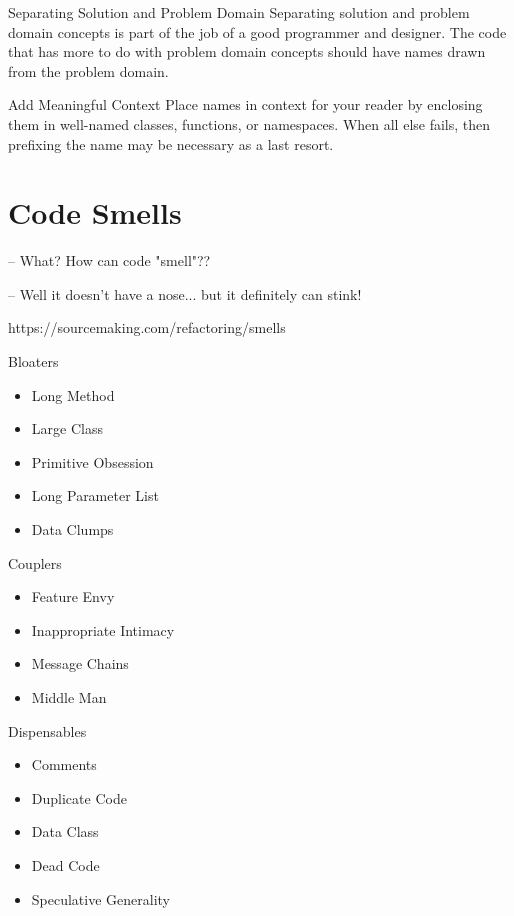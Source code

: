 \documentclass{beamer}
\begin{document}
\begin{frame}{Separating Solution and Problem Domain}
Separating solution and problem domain concepts is part of the job of a good
programmer and designer. The code that has more to do with problem domain
concepts should have names drawn from the problem domain.
\end{frame}

\begin{frame}{Add Meaningful Context}
Place names in context for your reader by enclosing them in well-named classes,
functions, or namespaces. When all else fails, then prefixing the name may be
necessary as a last resort. 
\end{frame}

\section{Code Smells}
\begin{frame}
    – What? How can code "smell"??

    – Well it doesn't have a nose... but it definitely can stink!

https://sourcemaking.com/refactoring/smells
\end{frame}

\begin{frame}{Bloaters}
\begin{itemize}
  \item Long Method
  \item Large Class
  \item Primitive Obsession
  \item Long Parameter List
  \item Data Clumps
\end{itemize}
\end{frame}

\begin{frame}{Couplers}
\begin{itemize}
  \item Feature Envy
  \item Inappropriate Intimacy
  \item Message Chains
  \item Middle Man
\end{itemize}
\end{frame}

\begin{frame}{Dispensables}
\begin{itemize}
  \item Comments
  \item Duplicate Code
  \item Data Class
  \item Dead Code
  \item Speculative Generality
\end{itemize}
\end{frame}
\end{document}
